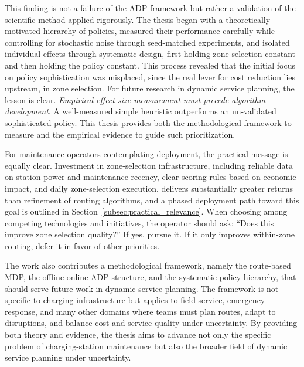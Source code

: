 \documentclass[12pt,oneside]{article}
\begin{document}
This finding is not a failure of the ADP framework but rather a validation of the scientific method applied rigorously. The thesis began with a theoretically motivated hierarchy of policies, measured their performance carefully while controlling for stochastic noise through seed-matched experiments, and isolated individual effects through systematic design, first holding zone selection constant and then holding the policy constant. This process revealed that the initial focus on policy sophistication was misplaced, since the real lever for cost reduction lies upstream, in zone selection. For future research in dynamic service planning, the lesson is clear. \emph{Empirical effect-size measurement must precede algorithm development}. A well-measured simple heuristic outperforms an un-validated sophisticated policy. This thesis provides both the methodological framework to measure and the empirical evidence to guide such prioritization.

For maintenance operators contemplating deployment, the practical message is equally clear. Investment in zone-selection infrastructure, including reliable data on station power and maintenance recency, clear scoring rules based on economic impact, and daily zone-selection execution, delivers substantially greater returns than refinement of routing algorithms, and a phased deployment path toward this goal is outlined in Section~\ref{subsec:practical_relevance}. When choosing among competing technologies and initiatives, the operator should ask: ``Does this improve zone selection quality?'' If yes, pursue it. If it only improves within-zone routing, defer it in favor of other priorities.

The work also contributes a methodological framework, namely the route-based MDP, the offline-online ADP structure, and the systematic policy hierarchy, that should serve future work in dynamic service planning. The framework is not specific to charging infrastructure but applies to field service, emergency response, and many other domains where teams must plan routes, adapt to disruptions, and balance cost and service quality under uncertainty. By providing both theory and evidence, the thesis aims to advance not only the specific problem of charging-station maintenance but also the broader field of dynamic service planning under uncertainty.


\clearpage
\lhead{}
\printbibliography[heading=bibintoc]
\end{document}
